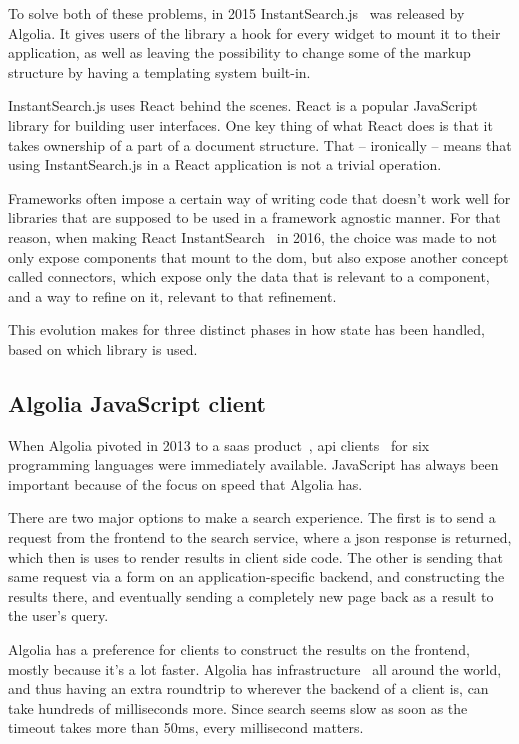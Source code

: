 To solve both of these problems, in 2015 InstantSearch.js~\cite{instantsearch-js} was released by Algolia. It gives users of the \gls{library} a hook for every widget to mount it to their application, as well as leaving the possibility to change some of the markup structure by having a templating system built-in.

InstantSearch.js uses React behind the scenes. React\cite{react-doc} is a popular JavaScript \gls{library} for building user interfaces. One key thing of what React does is that it takes ownership of a part of a document structure. That -- ironically -- means that using InstantSearch.js in a React application is not a trivial operation.

Frameworks often impose a certain way of writing code that doesn't work well for libraries that are supposed to be used in a framework agnostic manner. For that reason, when making React InstantSearch~\cite{react-instantsearch} in 2016, the choice was made to not only expose components that mount to the \acrshort{dom}, but also expose another concept called connectors, which expose only the data that is relevant to a component, and a way to refine on it, relevant to that refinement.

This evolution makes for three distinct phases in how state has been handled, based on which \gls{library} is used.

\subsection{Algolia JavaScript client} %
\label{sub:algolia_js_client}

When Algolia pivoted in 2013 to a \acrshort{saas} product~\cite{algolia-blog-saas}, \acrshort{api} clients~\cite{algolia-blog-lauch} for six programming languages were immediately available. JavaScript has always been important because of the focus on speed that Algolia has.

There are two major options to make a search experience. The first is to send a request from the frontend to the search service, where a \acrshort{json} response is returned, which then is uses to render results in client side code. The other is sending that same request via a form on an application-specific backend, and constructing the results there, and eventually sending a completely new page back as a result to the user's query.

Algolia has a preference for clients to construct the results on the frontend, mostly because it's a lot faster. Algolia has infrastructure~\cite{algolia-infra} all around the world, and thus having an extra roundtrip to wherever the backend of a client is, can take hundreds of milliseconds more. Since search seems slow as soon as the timeout takes more than 50ms, every millisecond matters.


